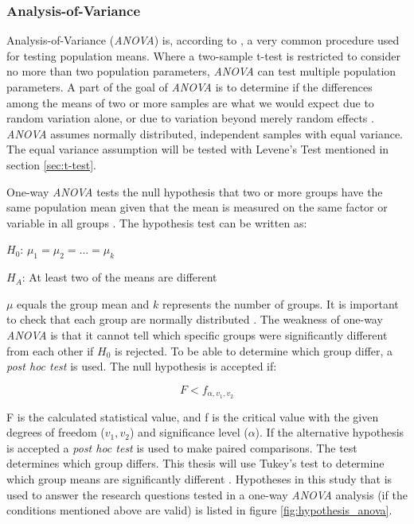 \subsubsection[ANOVA]{Analysis-of-Variance}\label{sec:anova}
Analysis-of-Variance (\textit{ANOVA}) is, according to \cite{Walpole2012}, a very common procedure used for testing population means. Where a two-sample t-test is restricted to consider no more than two population parameters, \textit{ANOVA} can test multiple population parameters. A part of the goal of \textit{ANOVA} is to determine if the differences among the means of two or more samples are what we would expect due to random variation alone, or due to variation beyond merely random effects \citep{Walpole2012}. \textit{ANOVA} assumes normally distributed, independent samples with equal variance. The equal variance assumption will be tested with Levene's Test mentioned in section \ref{sec:t-test}. 

One-way \textit{ANOVA} tests the null hypothesis that two or more groups have the same population mean given that the mean is measured on the same factor or variable in all groups \citep{LundResearchLtd2013a}. The hypothesis test can be written as:\newline

\centerline{$H_{0}$:  $\mu_{1} =  \mu_{2} = ... = \mu_{k} $} 
\centerline{$H_{A}$:  At least two of the means are different}

$\mu$ equals the group mean and $k$ represents the number of groups. It is important to check that each group are normally distributed \citep{LundResearchLtd2013a}. The weakness of one-way \textit{ANOVA} is that it cannot tell which specific groups were significantly different from each other if $H_{0}$ is rejected. To be able to determine which group differ, a \textit{post hoc test} is used. The null hypothesis is accepted if:

\begin{equation}
\label{eq:anova_reject}
F < f_{\alpha, v_{1}, v_{2}}
\end{equation}

F is the calculated statistical value, and f is the critical value with the given degrees of freedom ($v_{1}, v_{2}$) and significance level ($\alpha$). If the alternative hypothesis is accepted a \textit{post hoc test} is used to make paired comparisons. The test determines which group differs. This thesis will use Tukey's test to determine which group means are significantly different \citep[p.~526]{Walpole2012}. Hypotheses in this study that is used to answer the research questions tested in a one-way \textit{ANOVA} analysis (if the conditions mentioned above are valid) is listed in figure \ref{fig:hypothesis_anova}. 

